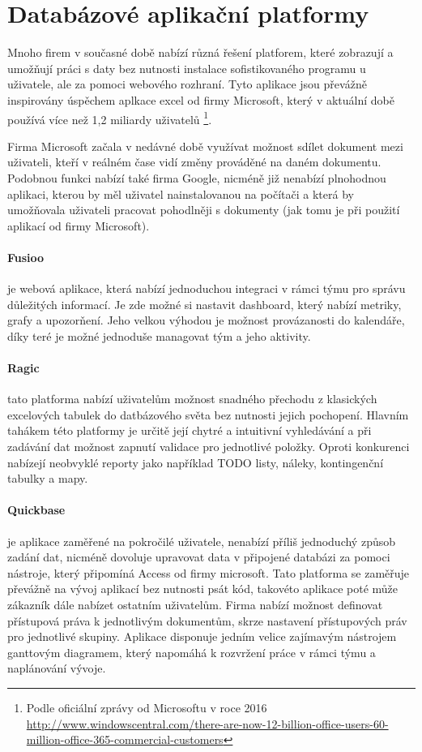 \section{Databázové aplikační platformy}
\par Mnoho firem v současné době nabízí různá řešení platforem, které zobrazují a umožňují práci s daty bez nutnosti instalace sofistikovaného programu u uživatele, ale za pomoci webového rozhraní. Tyto aplikace jsou převážně inspirovány úspěchem aplkace excel od firmy Microsoft, který v aktuální době používá více než 1,2 miliardy uživatelů \footnote{Podle oficiální zprávy od Microsoftu v roce 2016 \url{http://www.windowscentral.com/there-are-now-12-billion-office-users-60-million-office-365-commercial-customers}}. \par Firma Microsoft začala v nedávné době využívat možnost sdílet dokument mezi uživateli, kteří v reálném čase vidí změny prováděné na daném dokumentu. Podobnou funkci nabízí také firma Google, nicméně již nenabízí plnohodnou aplikaci, kterou by měl uživatel nainstalovanou na počítači a která by umožňovala uživateli pracovat pohodlněji s dokumenty (jak tomu je při použití aplikací od firmy Microsoft).

\paragraph{Fusioo} je webová aplikace, která nabízí jednoduchou integraci v rámci týmu pro správu důležitých informací. Je zde možné si nastavit dashboard, který nabízí metriky, grafy a upozorňení. Jeho velkou výhodou je možnost provázanosti do kalendáře, díky teré je možné jednoduše managovat tým a jeho aktivity.

\paragraph{Ragic} tato platforma nabízí uživatelům možnost snadného přechodu z klasických excelových tabulek do datbázového světa bez nutnosti jejich pochopení. Hlavním tahákem této platformy je určitě její chytré a intuitivní vyhledávání a při zadávání dat možnost zapnutí validace pro jednotlivé položky. Oproti konkurenci nabízejí neobvyklé reporty jako například TODO listy, náleky, kontingenční tabulky a mapy. 

\paragraph{Quickbase} je aplikace zaměřené na pokročilé uživatele, nenabízí příliš jednoduchý způsob zadání dat, nicméně dovoluje upravovat data v připojené databázi za pomoci nástroje, který připomíná Access od firmy microsoft. Tato platforma se zaměřuje převážně na vývoj aplikací bez nutnosti psát kód, takovéto aplikace poté může zákazník dále nabízet ostatním uživatelům. Firma nabízí možnost definovat přístupová práva k jednotlivým dokumentům, skrze nastavení přístupových práv pro jednotlivé skupiny. Aplikace disponuje jedním velice zajímavým nástrojem ganttovým diagramem, který napomáhá k rozvržení práce v rámci týmu a naplánování vývoje.

